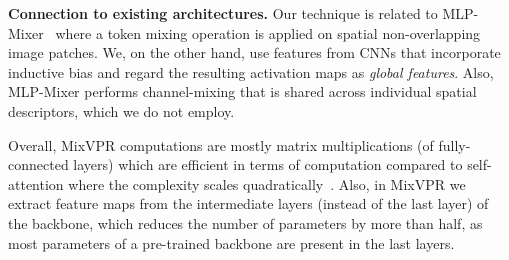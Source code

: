 \documentclass[10pt,twocolumn,letterpaper]{article}
\begin{document}
\vspace{5pt}
\noindent\textbf{Connection to existing architectures.} Our technique is related to MLP-Mixer~\cite{tolstikhin2021mlp} where a token mixing operation is applied on spatial non-overlapping image patches. We, on the other hand, use features from CNNs that incorporate inductive bias and regard the resulting activation maps as \textit{global features}. Also, MLP-Mixer performs channel-mixing that is shared across individual spatial descriptors, which we do not employ. 

Overall, MixVPR computations are mostly matrix multiplications (of fully-connected layers) which are efficient in terms of computation compared to self-attention where the complexity scales quadratically~\cite{tolstikhin2021mlp}. Also, in MixVPR we extract feature maps from the intermediate layers (instead of the last layer) of the backbone, which reduces the number of parameters by more than half, as most parameters of a pre-trained backbone are present in the last layers.
\end{document}
